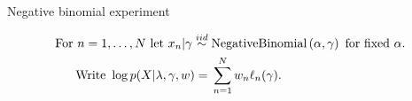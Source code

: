 





\begin{frame}{Negative binomial experiment}

%
\begin{align*}
\textrm{For }n={} 1,\ldots, N \textrm{ let }
    x_n |  \gamma \overset{iid}{\sim}{}& \textrm{NegativeBinomial}\left(\alpha, \gamma \right)
    \textrm{ for fixed }\alpha.\\
\textrm{Write }\log p(X \vert \lambda, \gamma, w) ={}&
       \sum_{n=1}^N w_n \ell_n(\gamma).
\end{align*}
%
\pause
%
\LowDimAccuracyGraph{}
%   
\end{frame}
    

    

